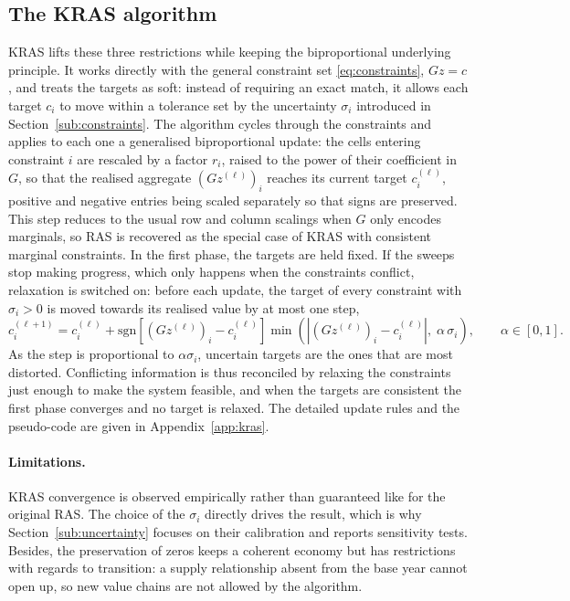\documentclass[11pt,a4paper]{article}
\begin{document}
\subsection{The KRAS algorithm}
\label{sub:kras}

KRAS \citep{lenzen09} lifts these three restrictions while keeping the biproportional underlying principle. It works directly with the general constraint set \eqref{eq:constraints}, $G z = c$, and treats the targets as soft: instead of requiring an exact match, it
allows each target $c_i$ to move within a tolerance set by the uncertainty $\sigma_i$ introduced in Section~\ref{sub:constraints}. The algorithm cycles through the constraints and applies to each one a generalised biproportional update: the cells entering constraint $i$ are rescaled by a factor $r_i$, raised to the power of their coefficient in $G$, so that the realised aggregate $(G z^{(\ell)})_i$ reaches its current target $c_i^{(\ell)}$, positive and negative entries being scaled separately so that signs are preserved. This step reduces to the usual row and column scalings when $G$ only encodes marginals, so RAS is recovered as the special case of KRAS with consistent marginal constraints. In the first phase, the targets are held fixed. If the sweeps stop making progress, which only happens when the constraints conflict, relaxation is switched on: before each update, the target of every constraint with $\sigma_i > 0$ is moved towards its realised value by at most one step,
\begin{equation}\label{eq:kras_relax}
  c_i^{(\ell+1)}
  = c_i^{(\ell)}
  + \mathrm{sgn}\!\left[ (G z^{(\ell)})_i - c_i^{(\ell)} \right]
    \min\!\left( \left| (G z^{(\ell)})_i - c_i^{(\ell)} \right| ,\; \alpha \, \sigma_i \right) ,
  \qquad \alpha \in [0,1] .
\end{equation}
As the step is proportional to $\alpha \sigma_i$, uncertain targets are the ones that are most distorted. Conflicting information is thus reconciled by relaxing the constraints just enough to make the system feasible, and when the targets are consistent the first phase converges and no target is relaxed. The detailed update rules and the pseudo-code are given in
Appendix~\ref{app:kras}.

\paragraph{Limitations.}
KRAS convergence is observed empirically rather than guaranteed like for the original RAS. The choice of the $\sigma_i$ directly drives the result, which is why Section~\ref{sub:uncertainty} focuses on their calibration and reports sensitivity tests. Besides, the
preservation of zeros keeps a coherent economy but has restrictions with regards to transition: a supply relationship absent from the base year cannot open up, so new value chains are not allowed by the algorithm.
\end{document}
